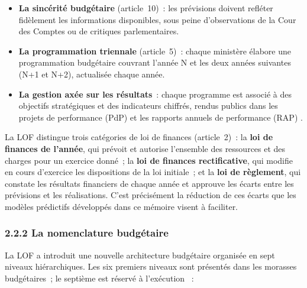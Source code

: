 \begin{itemize}
    \item \textbf{La sinc\'erit\'e budg\'etaire} (article~10)~: les pr\'evisions doivent refl\'eter fid\`element les informations disponibles, sous peine d'observations de la Cour des Comptes ou de critiques parlementaires.

    \item \textbf{La programmation triennale} (article~5)~: chaque minist\`ere \'elabore une programmation budg\'etaire couvrant l'ann\'ee N et les deux ann\'ees suivantes (N+1 et N+2), actualis\'ee chaque ann\'ee.

    \item \textbf{La gestion ax\'ee sur les r\'esultats}~: chaque programme est associ\'e \`a des objectifs strat\'egiques et des indicateurs chiffr\'es, rendus publics dans les projets de performance (PdP) et les rapports annuels de performance (RAP) \citep{Khallouk2019}.
\end{itemize}

La LOF distingue trois cat\'egories de loi de finances (article~2)~: la \textbf{loi de finances de l'ann\'ee}, qui pr\'evoit et autorise l'ensemble des ressources et des charges pour un exercice donn\'e~; la \textbf{loi de finances rectificative}, qui modifie en cours d'exercice les dispositions de la loi initiale~; et la \textbf{loi de r\`eglement}, qui constate les r\'esultats financiers de chaque ann\'ee et approuve les \'ecarts entre les pr\'evisions et les r\'ealisations. C'est pr\'ecis\'ement la r\'eduction de ces \'ecarts que les mod\`eles pr\'edictifs d\'evelopp\'es dans ce m\'emoire visent \`a faciliter.

\subsubsection*{2.2.2 \quad La nomenclature budg\'etaire}

La LOF a introduit une nouvelle architecture budg\'etaire organis\'ee en sept niveaux hi\'erarchiques. Les six premiers niveaux sont pr\'esent\'es dans les morasses budg\'etaires~; le septi\`eme est r\'eserv\'e \`a l'ex\'ecution \citep{MEF2015b}~:

